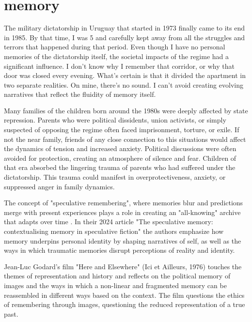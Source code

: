 \chapter*{memory}
\normalsize

\newpage  
The military dictatorship in Uruguay that started in 1973 finally came to its end in 1985. By that time, I was 5 and carefully kept away from all the struggles and terrors that happened during that period. Even though I have no personal memories of the dictatorship itself, the societal impacts of the regime had a significant influence. I don't know why I remember that corridor, or why that door was closed every evening. What's certain is that it divided the apartment in two separate realities. On mine, there's no sound. I can't avoid creating evolving narratives that reflect the fluidity of memory itself. 

Many families of the children born around the 1980s were deeply affected by state repression. Parents who were political dissidents, union activists, or simply suspected of opposing the regime often faced imprisonment, torture, or exile. If not the near family, friends of any close connection to this situations would affect the dynamics of tension and increased anxiety. Political discussions were often avoided for protection, creating an atmosphere of silence and fear. Children of that era absorbed the lingering trauma of parents who had suffered under the dictatorship. This trauma could manifest in overprotectiveness, anxiety, or suppressed anger in family dynamics.

The concept of "speculative remembering", where memories blur and predictions merge with present experiences plays a role in creating an "all-knowing" archive that adapts over time \citep{dutt2024}. In their 2024 article "The speculative memory: contextualising memory in speculative fiction" the authors emphasize how memory underpins personal identity by shaping narratives of self, as well as the ways in which traumatic memories disrupt perceptions of reality and identity.  

Jean-Luc Godard's film "Here and Elsewhere" (Ici et Ailleurs, 1976) touches the themes of representation and history and reflects on the political memory of images and the ways in which a non-linear and fragmented memory can be reassembled in different ways based on the context. The film questions the ethics of remembering through images, questioning the reduced representation of a true past. 

